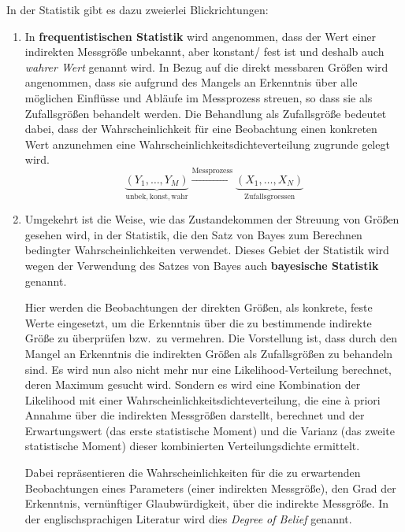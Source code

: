 In der Statistik gibt es dazu zweierlei Blickrichtungen:
\begin{enumerate}
\item In \textbf{frequentistischen Statistik} wird angenommen,
dass der Wert einer indirekten Messgröße unbekannt, aber konstant/ fest ist und deshalb
auch \textsl{wahrer Wert} genannt wird. In Bezug auf die direkt messbaren Größen wird angenommen,
dass sie aufgrund des Mangels an Erkenntnis über alle möglichen Einflüsse und Abläufe im Messprozess
streuen, so dass sie als Zufallsgrößen behandelt werden. Die Behandlung als Zufallsgröße
bedeutet dabei, dass der Wahrscheinlichkeit für eine Beobachtung einen konkreten Wert anzunehmen eine
Wahrscheinlichkeitsdichteverteilung zugrunde gelegt wird.
\begin{equation}
\underbrace{(Y_1, \dots, Y_M)}_{\mathrm{unbek, konst, wahr}} \xrightarrow{\mathrm{Messprozess}}
\underbrace{(X_1, \dots, X_N)}_{\mathrm{Zufallsgroessen}}
\end{equation}
\item Umgekehrt ist die Weise, wie das Zustandekommen der Streuung von Größen gesehen wird,
in der Statistik, die den Satz von Bayes zum Berechnen bedingter Wahrscheinlichkeiten 
verwendet. Dieses Gebiet der Statistik wird wegen der Verwendung des
Satzes von Bayes auch \textbf{bayesische Statistik} genannt.

Hier werden die Beobachtungen der direkten Größen, als konkrete, feste Werte eingesetzt,
um die Erkenntnis über die zu bestimmende indirekte Größe zu überprüfen bzw.\ zu vermehren.
Die Vorstellung ist, dass durch den Mangel an Erkenntnis die indirekten Größen als
Zufallsgrößen zu behandeln sind. Es wird nun also nicht mehr nur eine Likelihood-Verteilung
berechnet, deren Maximum gesucht wird. Sondern es wird eine Kombination der Likelihood mit
einer Wahrscheinlichkeitsdichteverteilung,
die eine {\`a} priori Annahme über die indirekten Messgrößen darstellt, berechnet und der
Erwartungswert (das erste statistische Moment) und die Varianz (das zweite statistische Moment)
dieser kombinierten Verteilungsdichte ermittelt.

Dabei repräsentieren die Wahrscheinlichkeiten für die zu erwartenden Beobachtungen eines Parameters
(einer indirekten Messgröße), 
den Grad der Erkenntnis, vernünftiger Glaubwürdigkeit, über die indirekte Messgröße.
In der englischsprachigen Literatur wird dies \textsl{Degree of Belief} genannt.


\end{enumerate}
